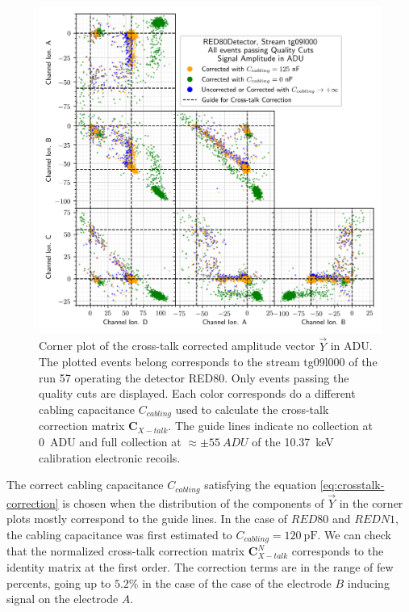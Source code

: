 \begin{figure}
\centering
\includegraphics[scale=1]{Figures/ElectrodesExperimental/red80_crosstalk_correction.png}
\caption{Corner plot of the cross-talk corrected amplitude vector $\vec{Y}$ in ADU. The plotted events belong corresponds to the stream tg09l000 of the run 57 operating the detector RED80. Only events passing the quality cuts are displayed. Each color corresponds do a different cabling capacitance $C_{cabling}$ used to calculate the cross-talk correction matrix $\bm{C}_{X-talk}$. The guide lines indicate no collection at \SI{0}{ADU} and full collection at $\approx \pm \SI{55}{ADU}$ of the \SI{10.37}{\kilo\eV} calibration electronic recoils.}
\label{fig:red80-crosstalk-correction}
\end{figure}

The correct cabling capacitance $C_{cabling}$ satisfying the equation \ref{eq:crosstalk-correction} is chosen when the distribution of the components of $\vec{Y}$ in the corner plots mostly correspond to the guide lines.
In the case of $RED80$ and $REDN1$, the cabling capacitance was first estimated to $C_{cabling} = \SI{120}{\pico\farad}$. 
We  can check that the normalized cross-talk correction matrix $\bm{C}_{X-talk}^N$ corresponds to the identity matrix at the first order. The correction terms are in the range of few percents, going up to $5.2\%$ in the case of the case of the electrode $B$ inducing signal on the electrode $A$.

